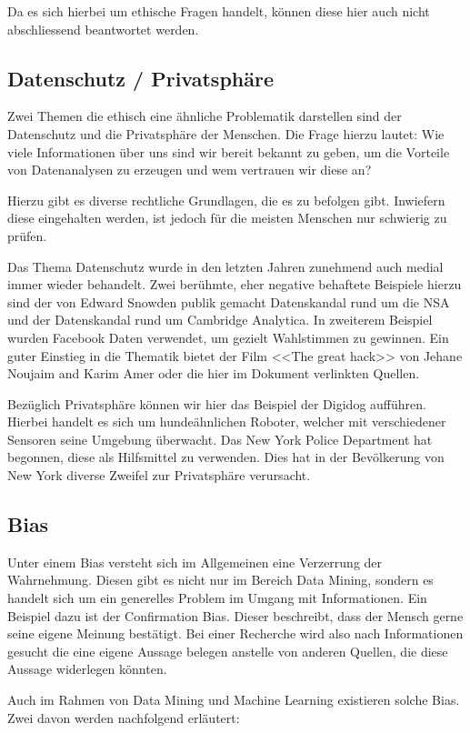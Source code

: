 Da es sich hierbei um ethische Fragen handelt, können diese hier auch nicht abschliessend beantwortet werden.

\subsection{Datenschutz / Privatsphäre}
Zwei Themen die ethisch eine ähnliche Problematik darstellen sind der Datenschutz und die Privatsphäre der Menschen.
Die Frage hierzu lautet: Wie viele Informationen über uns sind wir bereit bekannt zu geben, um die Vorteile von Datenanalysen zu erzeugen und wem vertrauen wir diese an?

Hierzu gibt es diverse rechtliche Grundlagen, die es zu befolgen gibt. Inwiefern diese eingehalten werden, ist jedoch für die meisten Menschen nur schwierig zu prüfen. 

Das Thema Datenschutz wurde in den letzten Jahren zunehmend auch medial immer wieder behandelt.
Zwei berühmte, eher negative behaftete Beispiele hierzu sind der von Edward Snowden publik gemacht Datenskandal rund um die NSA und der Datenskandal rund um Cambridge Analytica. In zweiterem Beispiel wurden Facebook Daten verwendet, um gezielt Wahlstimmen zu gewinnen.
Ein guter Einstieg in die Thematik bietet der Film <<The great hack>> von Jehane Noujaim and Karim Amer oder die hier im Dokument verlinkten Quellen. \cite{nsa} \cite{ca}

Bezüglich Privatsphäre können wir hier das Beispiel der Digidog aufführen. Hierbei handelt es sich um hundeähnlichen Roboter, welcher mit verschiedener Sensoren seine Umgebung überwacht. Das New York Police Department hat begonnen, diese als Hilfsmittel zu verwenden. Dies hat in der Bevölkerung von New York diverse Zweifel zur Privatsphäre verursacht.\cite{nypd}

\subsection{Bias}
Unter einem Bias versteht sich im Allgemeinen eine Verzerrung der Wahrnehmung. Diesen gibt es nicht nur im Bereich Data Mining, sondern es handelt sich um ein generelles Problem im Umgang mit Informationen.
Ein Beispiel dazu ist der Confirmation Bias. Dieser beschreibt, dass der Mensch gerne seine eigene Meinung bestätigt. Bei einer Recherche wird also nach Informationen gesucht die eine eigene Aussage belegen anstelle von anderen Quellen, die diese Aussage widerlegen könnten.\cite{bias}

Auch im Rahmen von Data Mining und Machine Learning existieren solche Bias. Zwei davon werden nachfolgend erläutert: \cite{bias2}

